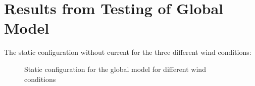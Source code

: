 \section{Results from Testing of Global Model}
The static configuration without current for the three different wind conditions: 
\begin{figure}[H]
\hfill
{}\hfill
  \hfill
\caption{Static configuration for the global model for different wind conditions}
\label{fig:statcon}
\end{figure}

